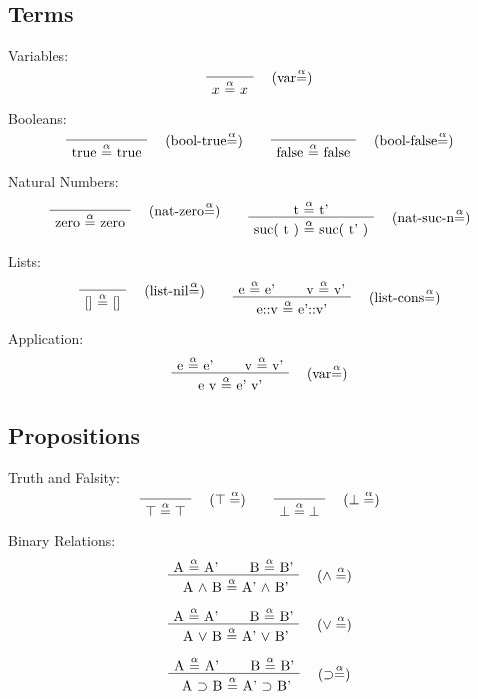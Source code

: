 \documentclass[twoside,a4paper]{article}
\theoremstyle{definition}
\begin{document}
\subsection{Terms}

Variables:
\[
\AxiomC{}
\RightLabel{\quad (var$\overset{\alpha}=$)}
\UnaryInfC{$x$ $\overset{\alpha}=$ $x$}
\DisplayProof
\]

Booleans:
\[
\AxiomC{}
\RightLabel{\quad (bool-true$\overset{\alpha}=$)}
\UnaryInfC{true $\overset{\alpha}=$ true}
\DisplayProof
\quad
\quad
\AxiomC{}
\RightLabel{\quad (bool-false$\overset{\alpha}=$)}
\UnaryInfC{false $\overset{\alpha}=$ false}
\DisplayProof
\]

Natural Numbers:
\[
\AxiomC{}
\RightLabel{\quad (nat-zero$\overset{\alpha}=$)}
\UnaryInfC{zero $\overset{\alpha}=$ zero}
\DisplayProof
\quad
\quad
\AxiomC{t  $\overset{\alpha}=$  t'}
\RightLabel{\quad (nat-suc-n$\overset{\alpha}=$)}
\UnaryInfC{suc( t ) $\overset{\alpha}=$ suc( t' )}
\DisplayProof
\]

Lists:
\[
\AxiomC{}
\RightLabel{\quad (list-nil$\overset{\alpha}=$)}
\UnaryInfC{[] $\overset{\alpha}=$ []}
\DisplayProof
\quad
\quad
\AxiomC{e  $\overset{\alpha}=$  e'}
\AxiomC{v  $\overset{\alpha}=$  v'}
\RightLabel{\quad (list-cons$\overset{\alpha}=$)}
\BinaryInfC{e::v $\overset{\alpha}=$ e'::v'}
\DisplayProof
\]

Application:
\[
\AxiomC{e $\overset{\alpha}=$ e'}
\AxiomC{v $\overset{\alpha}=$ v'}
\RightLabel{\quad (var$\overset{\alpha}=$)}
\BinaryInfC{e v $\overset{\alpha}=$ e' v'}
\DisplayProof
\]

\subsection{Propositions}
Truth and Falsity:
\[
\AxiomC{}
\RightLabel{\quad ($\top\overset{\alpha}=$)}
\UnaryInfC{$\top \overset{\alpha}= \top$}
\DisplayProof
\quad
\quad
\AxiomC{}
\RightLabel{\quad ($\bot\overset{\alpha}=$)}
\UnaryInfC{$\bot \overset{\alpha}= \bot$}
\DisplayProof
\]

Binary Relations:
\[
\AxiomC{A $\overset{\alpha}=$ A'}
\AxiomC{B $\overset{\alpha}=$ B'}
\RightLabel{\quad ($\wedge\overset{\alpha}=$)}
\BinaryInfC{ A $\wedge$ B $\overset{\alpha}=$ A' $\wedge$ B'}
\DisplayProof
\]

\[
\AxiomC{A $\overset{\alpha}=$ A'}
\AxiomC{B $\overset{\alpha}=$ B'}
\RightLabel{\quad ($\vee\overset{\alpha}=$)}
\BinaryInfC{ A $\vee$ B $\overset{\alpha}=$ A' $\vee$ B'}
\DisplayProof
\]

\[
\AxiomC{A $\overset{\alpha}=$ A'}
\AxiomC{B $\overset{\alpha}=$ B'}
\RightLabel{\quad ($\supset\overset{\alpha}=$)}
\BinaryInfC{ A $\supset$ B $\overset{\alpha}=$ A' $\supset$ B'}
\DisplayProof
\]
\end{document}
